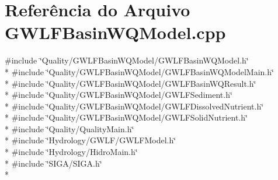 \section{Referência do Arquivo G\+W\+L\+F\+Basin\+W\+Q\+Model.\+cpp}
\label{_g_w_l_f_basin_w_q_model_8cpp}
{\ttfamily \#include \char`\"{}Quality/\+G\+W\+L\+F\+Basin\+W\+Q\+Model/\+G\+W\+L\+F\+Basin\+W\+Q\+Model.\+h\char`\"{}}\\*
{\ttfamily \#include \char`\"{}Quality/\+G\+W\+L\+F\+Basin\+W\+Q\+Model/\+G\+W\+L\+F\+Basin\+W\+Q\+Model\+Main.\+h\char`\"{}}\\*
{\ttfamily \#include \char`\"{}Quality/\+G\+W\+L\+F\+Basin\+W\+Q\+Model/\+G\+W\+L\+F\+Basin\+W\+Q\+Result.\+h\char`\"{}}\\*
{\ttfamily \#include \char`\"{}Quality/\+G\+W\+L\+F\+Basin\+W\+Q\+Model/\+G\+W\+L\+F\+Sediment.\+h\char`\"{}}\\*
{\ttfamily \#include \char`\"{}Quality/\+G\+W\+L\+F\+Basin\+W\+Q\+Model/\+G\+W\+L\+F\+Dissolved\+Nutrient.\+h\char`\"{}}\\*
{\ttfamily \#include \char`\"{}Quality/\+G\+W\+L\+F\+Basin\+W\+Q\+Model/\+G\+W\+L\+F\+Solid\+Nutrient.\+h\char`\"{}}\\*
{\ttfamily \#include \char`\"{}Quality/\+Quality\+Main.\+h\char`\"{}}\\*
{\ttfamily \#include \char`\"{}Hydrology/\+G\+W\+L\+F/\+G\+W\+L\+F\+Model.\+h\char`\"{}}\\*
{\ttfamily \#include \char`\"{}Hydrology/\+Hidro\+Main.\+h\char`\"{}}\\*
{\ttfamily \#include \char`\"{}S\+I\+G\+A/\+S\+I\+G\+A.\+h\char`\"{}}\\*
